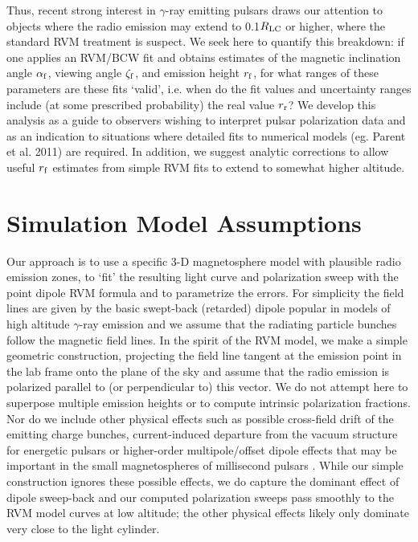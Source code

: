 	Thus, recent strong interest in $\gamma$-ray emitting pulsars draws our
attention to objects where the radio emission may extend to 0.1$R_{\rm{LC}}$ or higher,
where the standard RVM treatment is suspect. We seek here to quantify this breakdown:
if one applies an RVM/BCW fit and obtains estimates of the magnetic inclination 
angle $\alpha_{\rm{f}}$, viewing angle $\zeta_{\rm{f}}$, and emission height $r_{\rm{f}}$, for what ranges
of these parameters are these fits `valid', i.e. when do the fit values and uncertainty
ranges include (at some prescribed probability) the real value
$r_{\rm{r}}$? We develop this analysis as a guide to observers wishing to
interpret pulsar polarization data and as an indication to situations where detailed
fits to numerical models (eg. Parent et al. 2011) are required. In addition,
we suggest analytic corrections to allow useful $r_{\rm{f}}$
estimates from simple RVM fits to extend to somewhat higher altitude.

\section{Simulation Model Assumptions}                                              

	Our approach is to use a specific 3-D magnetosphere model with plausible
radio emission zones, to `fit' the resulting light curve and polarization
sweep with the point dipole RVM formula and to parametrize the errors.
For simplicity the field lines are given by the basic swept-back (retarded) dipole
popular in models of high altitude $\gamma$-ray emission \citep{romani2010constraining} and 
we assume that the radiating particle bunches follow the magnetic field lines.
In the spirit of the RVM model, we make a simple geometric construction,
projecting the field line tangent at the emission point in the lab frame
onto the plane of the sky and assume that the radio emission is polarized 
parallel to (or perpendicular to) this vector.  We do not attempt here to 
superpose multiple emission heights or to compute intrinsic polarization 
fractions. Nor do we include other physical effects such as possible 
cross-field drift of the emitting charge bunches, current-induced departure 
from the vacuum structure for energetic pulsars \citep{spitkovsky2006time} or higher-order 
multipole/offset dipole effects that may be important in the small 
magnetospheres of millisecond pulsars \citep{harding2011pulsar}.  While our simple 
construction ignores these possible effects, we do capture the dominant 
effect of dipole sweep-back and our computed polarization sweeps pass 
smoothly to the RVM model curves at low altitude; the other physical effects 
likely only dominate very close to the light cylinder.

